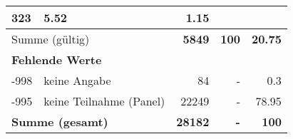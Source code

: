 \begin{longtable}{lXrrr}
       \num{323} &
       \num[round-mode=places,round-precision=2]{5.52} &
         \num[round-mode=places,round-precision=2]{1.15} \\
     \midrule
     \multicolumn{2}{l}{Summe (gültig)} &
       \textbf{\num{5849}} &
     \textbf{100} &
       \textbf{\num[round-mode=places,round-precision=2]{20.75}} \\
     \multicolumn{5}{l}{\textbf{Fehlende Werte}}\\
       -998 &
       keine Angabe &
         \num{84} &
        - &
         \num[round-mode=places,round-precision=2]{0.3} \\
       -995 &
       keine Teilnahme (Panel) &
         \num{22249} &
        - &
         \num[round-mode=places,round-precision=2]{78.95} \\
     \midrule
     \multicolumn{2}{l}{\textbf{Summe (gesamt)}} &
          \textbf{\num{28182}} &
        \textbf{-} &
        \textbf{100} \\
     \bottomrule
     \end{longtable}
     

